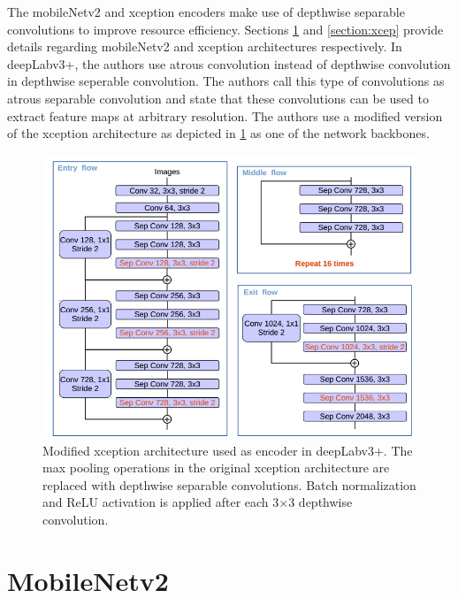 The mobileNetv2 and xception encoders make use of depthwise separable convolutions to improve resource efficiency. Sections \ref{section:mn} and \ref{section:xcep} provide details regarding mobileNetv2 and xception architectures respectively. In deepLabv3+, the authors use atrous convolution instead of depthwise convolution in depthwise seperable convolution. The authors call this type of convolutions as atrous separable convolution and state that these convolutions can be used to extract feature maps at arbitrary resolution. The authors use a modified version of the xception architecture as depicted in \ref{Fig:deepLabv4_xcep} as one of the network backbones.

	\begin{figure}[!htb]
		\centering
		\includegraphics[width=.8\linewidth]{images/deepLabv4_xcep}
		\caption{Modified xception architecture used as encoder in deepLabv3+. The max pooling operations in the original xception architecture are replaced with depthwise separable convolutions. Batch normalization and ReLU activation is applied after each 3$\times$3 depthwise convolution.}
		\label{Fig:deepLabv4_xcep}
	\end{figure}

\section{MobileNetv2}
\label{section:mn}




